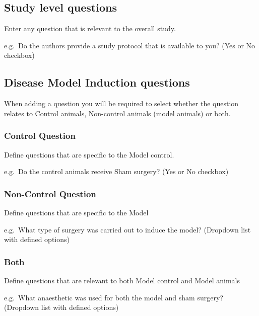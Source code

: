 \documentclass[
]{book}
\begin{document}
\hypertarget{study-level-questions}{%
\subsection{Study level questions}\label{study-level-questions}}

Enter any question that is relevant to the overall study.

e.g.~Do the authors provide a study protocol that is available to you?
(Yes or No checkbox)

\hypertarget{disease-model-induction-questions}{%
\subsection{Disease Model Induction questions}\label{disease-model-induction-questions}}

When adding a question you will be required to select whether the question relates to Control animals, Non-control animals (model animals) or both.

\hypertarget{control-question}{%
\subsubsection{Control Question}\label{control-question}}

Define questions that are specific to the Model control.

e.g.~Do the control animals receive Sham surgery?
(Yes or No checkbox)

\hypertarget{non-control-question}{%
\subsubsection{Non-Control Question}\label{non-control-question}}

Define questions that are specific to the Model

e.g.~What type of surgery was carried out to induce the model?
(Dropdown list with defined options)

\hypertarget{both}{%
\subsubsection{Both}\label{both}}

Define questions that are relevant to both Model control and Model animals

e.g.~What anaesthetic was used for both the model and sham surgery?
(Dropdown list with defined options)
\end{document}
